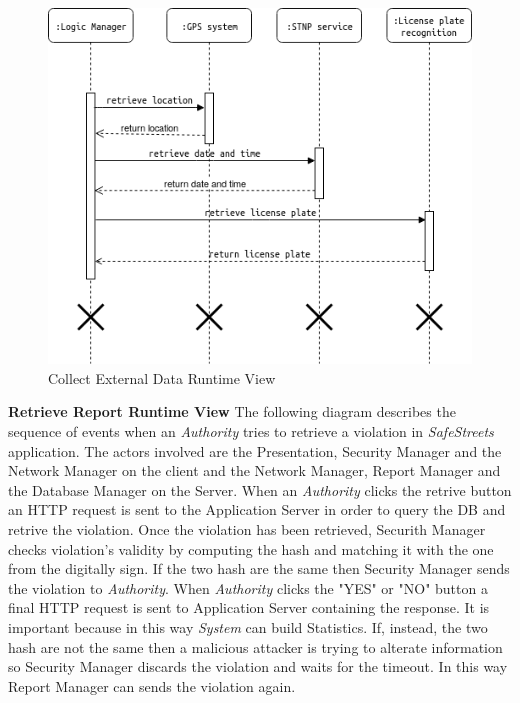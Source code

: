 \documentclass{article}
\begin{document}
\begin{figure}[H]
    \centering
    \includegraphics[scale=0.4]{img/sequence_diagrams/collect_external_data_sequence.png}
    \caption{Collect External Data Runtime View}
\end{figure}

\textbf{Retrieve Report Runtime View}
The following diagram describes the sequence of events when an \textit{Authority} tries to retrieve a violation in
\textit{SafeStreets} application. The actors involved are the Presentation, Security Manager and the Network 
Manager on the client and the Network Manager, Report Manager and the Database Manager on the Server.
When an \textit{Authority} clicks the retrive button an HTTP request is sent to the Application Server in order to
query the DB and retrive the violation. Once the violation has been retrieved, Securith Manager checks violation's 
validity by computing the hash and matching it with the one from the digitally sign. If the two hash are the same then
Security Manager sends the violation to \textit{Authority}. When \textit{Authority} clicks the "YES" or "NO" button a final
HTTP request is sent to Application Server containing the response. It is important because in this way \textit{System} can
build Statistics. If, instead, the two hash are not the same then a malicious attacker is trying to alterate information so
Security Manager discards the violation and waits for the timeout. In this way Report Manager can sends the violation again.     
\end{document}
